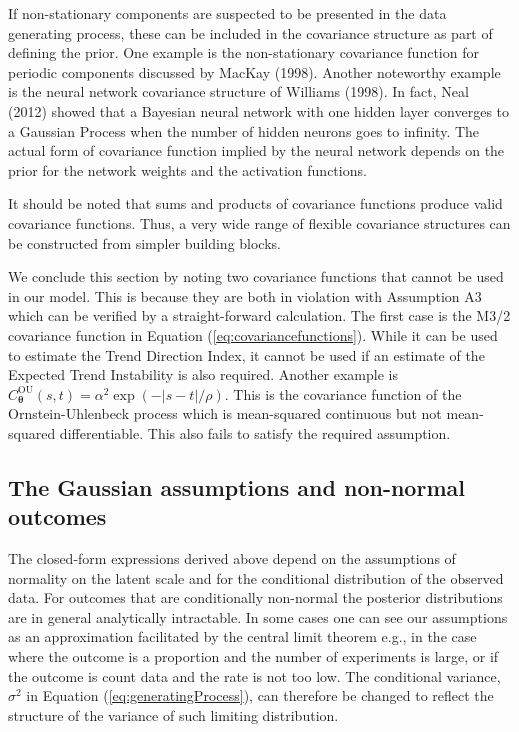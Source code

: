 \documentclass[
  11pt,
]{article}
\theoremstyle{nonumberplain}
\begin{document}
If non-stationary components are suspected to be presented in the data
generating process, these can be included in the covariance structure as
part of defining the prior. One example is the non-stationary covariance
function for periodic components discussed by MacKay (1998). Another
noteworthy example is the neural network covariance structure of
Williams (1998). In fact, Neal (2012) showed that a Bayesian neural
network with one hidden layer converges to a Gaussian Process when the
number of hidden neurons goes to infinity. The actual form of covariance
function implied by the neural network depends on the prior for the
network weights and the activation functions.

It should be noted that sums and products of covariance functions
produce valid covariance functions. Thus, a very wide range of flexible
covariance structures can be constructed from simpler building blocks.

We conclude this section by noting two covariance functions that cannot
be used in our model. This is because they are both in violation with
Assumption A3 which can be verified by a straight-forward calculation.
The first case is the M3/2 covariance function in Equation
(\ref{eq:covariancefunctions}). While it can be used to estimate the
Trend Direction Index, it cannot be used if an estimate of the Expected
Trend Instability is also required. Another example is
\(C_{\bm{\theta}}^\text{OU}(s, t) = \alpha^2 \exp\left(-|s-t|/\rho\right)\).
This is the covariance function of the Ornstein-Uhlenbeck process which
is mean-squared continuous but not mean-squared differentiable. This
also fails to satisfy the required assumption.

\hypertarget{sec:gaussianassumptions}{%
\subsection{The Gaussian assumptions and non-normal
outcomes}\label{sec:gaussianassumptions}}

The closed-form expressions derived above depend on the assumptions of
normality on the latent scale and for the conditional distribution of
the observed data. For outcomes that are conditionally non-normal the
posterior distributions are in general analytically intractable. In some
cases one can see our assumptions as an approximation facilitated by the
central limit theorem e.g., in the case where the outcome is a
proportion and the number of experiments is large, or if the outcome is
count data and the rate is not too low. The conditional variance,
\(\sigma^2\) in Equation (\ref{eq:generatingProcess}), can therefore be
changed to reflect the structure of the variance of such limiting
distribution.
\end{document}
